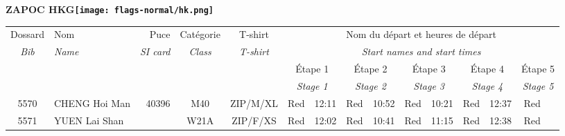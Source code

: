 \documentclass{report}
\begin{document}
\newpage
  \Huge \centering \bfseries ZAPOC  HKG\normalfont \footnotesize \sffamily \hfill \texttt{[image: flags-normal/hk.png]} \newline 
  \begin{longtable}{|c|l|r|c|c|*{5}{cc|}}
    Dossard & Nom  & Puce    & Catégorie & T-shirt & \multicolumn{10}{c|}{Nom du départ et heures de départ} \\
    \itshape Bib     & \itshape Name & \itshape SI card & \itshape Class  & \itshape  T-shirt  & \multicolumn{10}{c|}{\itshape Start names and start times} \\
    \hline
    & & & & & \multicolumn{2}{c|}{Étape 1} & \multicolumn{2}{c|}{Étape 2} & \multicolumn{2}{c|}{Étape 3} & \multicolumn{2}{c|}{Étape 4} & \multicolumn{2}{c|}{Étape 5} \\
    & & & & & \multicolumn{2}{c|}{\itshape Stage 1} & \multicolumn{2}{c|}{\itshape Stage 2} & \multicolumn{2}{c|}{\itshape Stage 3} & \multicolumn{2}{c|}{\itshape Stage 4} & \multicolumn{2}{c|}{\itshape Stage 5} \\
    \hline
    5570 & CHENG Hoi Man & 40396 & M40 & ZIP/M/XL & Red & 12:11 & Red & 10:52 & Red & 10:21 & Red & 12:37 & Red &  \\
    5571 & YUEN Lai Shan &  & W21A & ZIP/F/XS & Red & 12:02 & Red & 10:41 & Red & 11:15 & Red & 12:38 & Red &  \\
  \end{longtable}
\newpage
\end{document}
